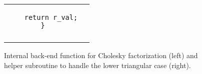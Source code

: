 \begin{figure}[t]
\begin{center}
\begin{tabular}{|c|c|}
\begin{minipage}[t]{3in}
{\begin{verbatim}
    return r_val;
}
\end{verbatim}
}
\end{minipage}
\\
 & \\ \hline
\end{tabular}
\end{center}
\caption{
Internal back-end function for Cholesky factorization (left) and helper
subroutine to handle the lower triangular case (right).
}
\label{fig:cntl-internal-back-ends}
\end{figure}
